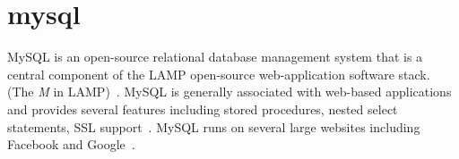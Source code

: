 \section{mysql}

MySQL is an open-source relational database management system that is
a central component of the LAMP open-source web-application software
stack.  (The \textit{M} in LAMP)~\cite{hid-sp18-407-mysql}.  MySQL is
generally associated with web-based applications and provides several
features including stored procedures, nested select statements, SSL
support~\cite{hid-sp18-407-mysql}.  MySQL runs on several large
websites including Facebook and Google~\cite{hid-sp18-407-mysql}.

